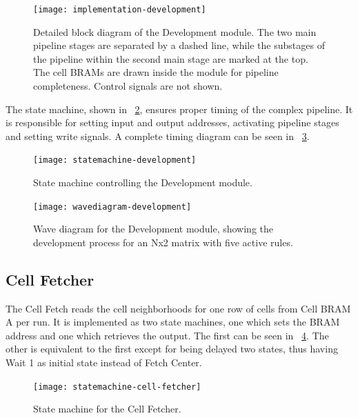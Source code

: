 \begin{figure}[!ht]
    \centering
    \texttt{[image: implementation-development]}
    \caption[Development module]{
        Detailed block diagram of the Development module.
        The two main pipeline stages are separated by a dashed line,
        while the substages of the pipeline within the second main stage are marked at the top.
        The cell BRAMs are drawn inside the module for pipeline completeness.
        Control signals are not shown.
    }
    \label{fig:implementation-development}
\end{figure}

The state machine, shown in \figurename~\ref{fig:statemachine-development}, ensures proper timing of the complex pipeline.
It is responsible for setting input and output addresses, activating pipeline stages and setting write signals.
A complete timing diagram can be seen in \figurename~\ref{fig:wavediagram-development}.

\begin{figure}[!ht]
    \centering
    \texttt{[image: statemachine-development]}
    \caption[Development module state machine]{
        State machine controlling the Development module.
    }
    \label{fig:statemachine-development}
\end{figure}

\begin{figure}
    \centering
    \texttt{[image: wavediagram-development]}
    \caption[Development module wave diagram]{
        Wave diagram for the Development module, showing the development process for an Nx2 matrix with five active rules.
    }
    \label{fig:wavediagram-development}
\end{figure}

\subsection{Cell Fetcher}

The Cell Fetch reads the cell neighborhoods for one row of cells from Cell BRAM A per run.
It is implemented as two state machines, one which sets the BRAM address and one which retrieves the output.
The first can be seen in \figurename~\ref{fig:statemachine-cell-fetcher}.
The other is equivalent to the first except for being delayed two states, thus having Wait 1 as initial state instead of Fetch Center.

\begin{figure}[!ht]
    \centering
    \texttt{[image: statemachine-cell-fetcher]}
    \caption[Cell Fetcher state machine]{
        State machine for the Cell Fetcher.
    }
    \label{fig:statemachine-cell-fetcher}
\end{figure}

